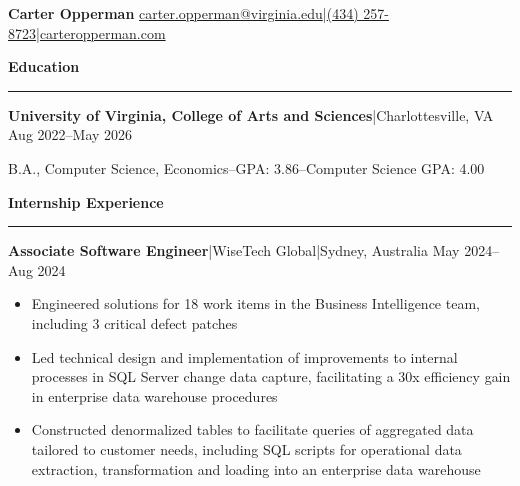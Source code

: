 \documentclass[11pt,letterpaper]{article}
\newcommand{\horibar}[2]{#1\hspace{5pt}|\hspace{5pt}#2}
\newcommand{\sep}[1]{\par\vspace{#1}}
\renewenvironment{section}[1]{
\sep{11pt}
{
\fontsize{14}{2}
\selectfont
\textbf{#1}\\[0.5pt]
}
\sep{6pt}
\noindent\rule{\linewidth}{0.5pt}
\sep{4pt}
}
{
}
\renewenvironment{subsection}[3]
{
\sep{4pt}
\horibar{\textbf{#1}}{#2} \hfill #3
\par\setstretch{1}
\begin{itemize}
}
{
\end{itemize}
\setstretch{0}
}
\begin{document}
{\fontsize{20}{1} \selectfont \textbf{Carter Opperman}} \hfill \horibar{\href{mailto:carter.opperman@virginia.edu}{carter.opperman@virginia.edu}}{\horibar{\href{tel:+14342578723}{(434) 257-8723}}{\href{https://carteropperman.com}{carteropperman.com}}}
\sep{5pt}

\begin{section}{Education}
    \sep{4pt}
    \horibar{\textbf{University of Virginia, College of Arts and Sciences}}{Charlottesville, VA} \hfill Aug 2022–May 2026
    \sep{4pt}
    \par\hspace{6pt}B.A., Computer Science, Economics\hspace{5pt}–\hspace{5pt}GPA: 3.86\hspace{5pt}–\hspace{5pt}Computer Science GPA: 4.00
    \sep{2pt}
\end{section}

\begin{section}{Internship Experience}
    \begin{subsection}{Associate Software Engineer}{\horibar{WiseTech Global}{Sydney, Australia}}{May 2024–Aug 2024}
        \item Engineered solutions for 18 work items in the Business Intelligence team, including 3 critical defect patches
        \item Led technical design and implementation of improvements to internal processes in SQL Server change data capture, facilitating a 30x efficiency gain in enterprise data warehouse procedures
        \item Constructed denormalized tables to facilitate queries of aggregated data tailored to customer needs, including SQL scripts for operational data extraction, transformation and loading into an enterprise data warehouse
    \end{subsection}
\end{section}
\end{document}
